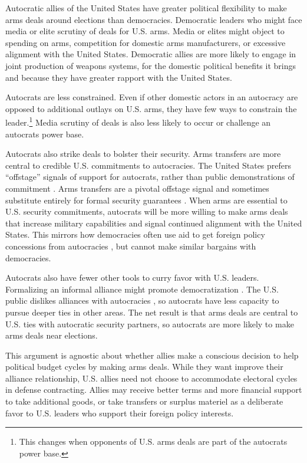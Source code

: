 \documentclass[12pt]{article}
\begin{document}
Autocratic allies of the United States have greater political flexibility to make arms deals around elections than democracies. 
Democratic leaders who might face media or elite scrutiny of deals for U.S. arms.
Media or elites might object to spending on arms, competition for domestic arms manufacturers, or excessive alignment with the United States.
Democratic allies are more likely to engage in joint production of weapons systems, for the domestic political benefits it brings and because they have greater rapport with the United States. 


Autocrats are less constrained.
Even if other domestic actors in an autocracy are opposed to additional outlays on U.S. arms, they have few ways to constrain the leader.\footnote{This changes when opponents of U.S. arms deals are part of the autocrats power base.}
Media scrutiny of deals is also less likely to occur or challenge an autocrats power base. 


Autocrats also strike deals to bolster their security.
Arms transfers are more central to credible U.S. commitments to autocracies.  
The United States prefers ``offstage'' signals of support for autocrats, rather than public demonstrations of commitment \citep{McManusYarhi-Milo2017}.
Arms transfers are a pivotal offstage signal and sometimes substitute entirely for formal security guarantees \citep{Yarhi-Miloetal2016}. 
When arms are essential to U.S. security commitments, autocrats will be more willing to make arms deals that increase military capabilities and signal continued alignment with the United States.
This mirrors how democracies often use aid to get foreign policy concessions from autocracies \citep{BDMSmith2009}, but cannot make similar bargains with democracies. 

Autocrats also have fewer other tools to curry favor with U.S. leaders.
Formalizing an informal alliance might promote democratization \citep{GiblerWolford2006, Warren2016}.
The U.S. public dislikes alliances with autocracies \citep{Alley2022}, so autocrats have less capacity to pursue deeper ties in other areas. 
The net result is that arms deals are central to U.S. ties with autocratic security partners, so autocrats are more likely to make arms deals near elections. 


This argument is agnostic about whether allies make a conscious decision to help political budget cycles by making arms deals.
While they want improve their alliance relationship, U.S. allies need not choose to accommodate electoral cycles in defense contracting.
Allies may receive better terms and more financial support to take additional goods, or take transfers or surplus materiel as a deliberate favor to U.S. leaders who support their foreign policy interests. 
\end{document}
